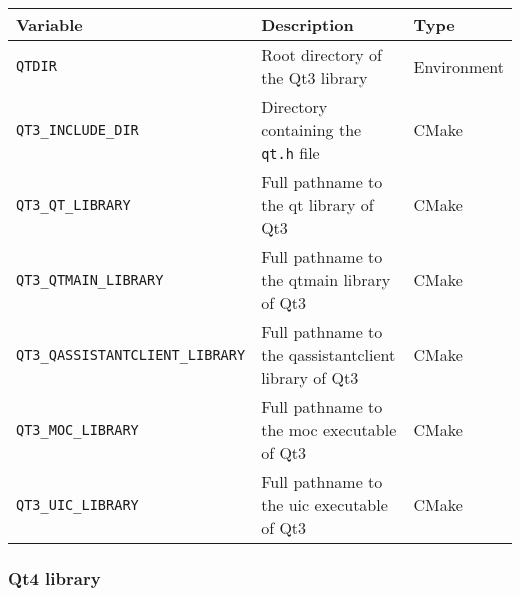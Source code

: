 {\ccTexHtml{\small}{}
\renewcommand{\arraystretch}{1.3}
\gdef\lcTabularBorder{2}
\begin{tabular}{|l|l|l|} \hline
  \textbf{Variable}                       & \textbf{Description}                                  & \textbf{Type}\\\hline\hline
  \texttt{QTDIR}                          & Root directory of the Qt3 library                     & Environment\\\hline
  \texttt{QT3\_INCLUDE\_DIR}              & Directory containing the \texttt{qt.h} file           & CMake\\\hline
  \texttt{QT3\_QT\_LIBRARY}               & Full pathname to the qt library of Qt3                & CMake\\\hline
  \texttt{QT3\_QTMAIN\_LIBRARY}           & Full pathname to the qtmain library of Qt3            & CMake\\\hline
  \texttt{QT3\_QASSISTANTCLIENT\_LIBRARY} & Full pathname to the qassistantclient library of Qt3  & CMake\\\hline
  \texttt{QT3\_MOC\_LIBRARY}              & Full pathname to the moc executable of Qt3             & CMake\\\hline
  \texttt{QT3\_UIC\_LIBRARY}              & Full pathname to the uic executable of Qt3             & CMake\\\hline
\end{tabular}
}

\subsubsection{Qt4 library}

